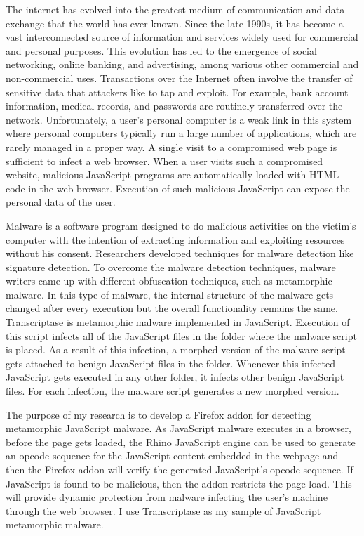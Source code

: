 The internet has evolved into the greatest medium of communication and data exchange that the world has ever known. Since the late 1990s, it has become a vast interconnected source of information and services widely used for commercial and personal purposes. This evolution has led to the emergence of social networking, online banking, and advertising, among various other commercial and non-commercial uses. Transactions over the Internet often involve the transfer of sensitive data that attackers like to tap and exploit. For example, bank account information, medical records, and passwords are routinely transferred over the network. Unfortunately, a user's personal computer is a weak link in this system where personal computers typically run a large number of applications, which are rarely managed in a proper way. A single visit to a compromised web page is sufficient to infect a web browser. When a user visits such a compromised website, malicious JavaScript programs are automatically loaded with HTML code in the web browser. Execution of such malicious JavaScript can expose the personal data of the user. 

Malware is a software program designed to do malicious activities on the victim's computer with the intention of extracting information and exploiting resources without his consent. Researchers developed techniques for malware detection like signature detection. To overcome the malware detection techniques, malware writers came up with different obfuscation techniques, such as metamorphic malware. In this type of malware, the internal structure of the malware gets changed after every execution but the overall functionality remains the same. Transcriptase is metamorphic malware implemented in JavaScript. Execution of this script infects all of the JavaScript files in the folder where the malware script is placed. As a result of this infection, a morphed version of the malware script gets attached to benign JavaScript files in the folder. Whenever this infected JavaScript gets executed in any other folder, it infects other benign JavaScript files. For each infection, the malware script generates a new morphed version.

The purpose of my research is to develop a Firefox addon for detecting metamorphic JavaScript malware. As JavaScript malware executes in a browser, before the page gets loaded, the Rhino JavaScript engine can be used to generate an opcode sequence for the JavaScript content embedded in the webpage and then the Firefox addon will verify the generated JavaScript's opcode sequence. If JavaScript is found to be malicious, then the addon restricts the page load. This will provide dynamic protection from malware infecting the user's machine through the web browser. I use Transcriptase as my sample of JavaScript metamorphic malware.


